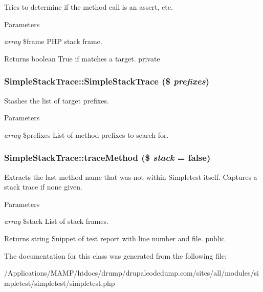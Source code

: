 \label{class_simple_stack_trace_a0789e56a3e37b581790028a929ffa93e}
Tries to determine if the method call is an assert, etc. 
\begin{DoxyParams}{Parameters}
\item[{\em array}]\$frame PHP stack frame. \end{DoxyParams}
\begin{DoxyReturn}{Returns}
boolean True if matches a target.  private 
\end{DoxyReturn}
\hypertarget{class_simple_stack_trace_a0d1dea001f052dfadb2e67892002bd1e}{
\subsubsection[{SimpleStackTrace}]{\setlength{\rightskip}{0pt plus 5cm}SimpleStackTrace::SimpleStackTrace (\$ {\em prefixes})}}
\label{class_simple_stack_trace_a0d1dea001f052dfadb2e67892002bd1e}
Stashes the list of target prefixes. 
\begin{DoxyParams}{Parameters}
\item[{\em array}]\$prefixes List of method prefixes to search for. \end{DoxyParams}
\hypertarget{class_simple_stack_trace_a56b36eeb068dc6552cf000b7e4217040}{
\subsubsection[{traceMethod}]{\setlength{\rightskip}{0pt plus 5cm}SimpleStackTrace::traceMethod (\$ {\em stack} = {\ttfamily false})}}
\label{class_simple_stack_trace_a56b36eeb068dc6552cf000b7e4217040}
Extracts the last method name that was not within Simpletest itself. Captures a stack trace if none given. 
\begin{DoxyParams}{Parameters}
\item[{\em array}]\$stack List of stack frames. \end{DoxyParams}
\begin{DoxyReturn}{Returns}
string Snippet of test report with line number and file.  public 
\end{DoxyReturn}


The documentation for this class was generated from the following file:\begin{DoxyCompactItemize}
\item 
/Applications/MAMP/htdocs/drump/drupalcodedump.com/sites/all/modules/simpletest/simpletest/simpletest.php\end{DoxyCompactItemize}
